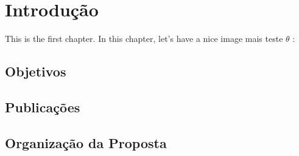 
\chapter{Introdução}

This is the first chapter. In this chapter, let's have a nice image mais teste $\theta$  :

\section{Objetivos}

\section{Publicações}

\section{Organização da Proposta}

